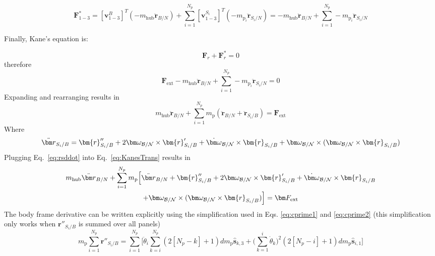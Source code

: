 \begin{equation}
	\bm F^*_{1-3} = [\bm v^{B}_{1-3}]^T (-m_{\text{hub}} \ddot{\bm r}_{B/N}) + \sum\limits_{i=1}^{N_p}[\bm v^{S_i}_{1-3}]^T (-m_{\text{p}_i} \ddot{\bm r}_{S_{i}/N}) = -m_{\text{hub}} \ddot{\bm r}_{B/N} + \sum\limits_{i=1}^{N_p} -m_{\text{p}_i}\ddot{\bm r}_{S_{i}/N}
\end{equation}

Finally, Kane's equation is:

\begin{equation}
	\bm F_r + \bm F^*_r = 0
	\label{eq:KanesEq}
\end{equation}
therefore
\begin{equation}
	\bm F_{\text{ext}} -m_{\text{hub}} \ddot{\bm r}_{B/N} + \sum\limits_{i=1}^{N_p} -m_{\text{p}_i}\ddot{\bm r}_{S_{i}/N} = 0
\end{equation}
Expanding and rearranging results in
\begin{equation}
	m_{\text{hub}} \ddot{\bm r}_{B/N}  + \sum\limits_{i=1}^{N_p} m_{\text{p}} (\ddot{\bm r}_{B/N} + \ddot{\bm r}_{S_{i}/B}) = \bm F_{\text{ext}}
	\label{eq:KanesTrans}
\end{equation}
Where
\begin{equation}
	\ddot{\bm r}_{S_i/B} = \bm{r}''_{S_i/B} + 2 \bm\omega_{\cal B/N} \times \bm{r}'_{S_i/B} +  \dot{\bm\omega}_{\cal B/N} \times \bm{r}_{S_i/B} + \bm\omega_{\cal B/N} \times (\bm\omega_{\cal B/N} \times \bm{r}_{S_i/B})
	\label{eq:rsddot}
\end{equation}
Plugging Eq.~\eqref{eq:rsddot} into Eq.~\eqref{eq:KanesTrans} results in
\begin{multline}
	m_{\text{hub}} \ddot{\bm r}_{B/N} +  \sum\limits_{i=1}^{N_p} m_{\text{p}} \Big[\ddot{\bm r}_{B/N} +  \bm{r}''_{S_i/B}
	+ 2 \bm\omega_{\cal B/N} \times \bm{r}'_{S_i/B} +  \dot{\bm\omega}_{\cal B/N} \times \bm{r}_{S_i/B}
	\\ + \bm\omega_{\cal B/N} \times (\bm\omega_{\cal B/N} \times \bm{r}_{S_i/B})\Big] = \bm F_{\text{ext}}
\end{multline}
The body frame derivative can be written explicitly using the simplification used in Eqs. \ref{eq:cprime1} and \ref{eq:cprime2} (this simplification only works when $\bm{r}''_{S_i/B}$ is summed over all panels)
\begin{equation}
	m_{\text{p}} \sum^{N_p}_{i=1} \bm{r}''_{S_i/B} = \sum^{N_p}_{i=1} \Big[ \ddot{\theta}_i \sum^{N_p}_{k=i} (2[N_p-k]+1) d m_{\text{p}} \bm{\hat{s}}_{k,3} + \Big(\sum^{i}_{k=1}\dot{\theta}_k\Big)^2 (2[N_p-i]+1) d m_{\text{p}} \bm{\hat{s}}_{i,1} \Big]
\end{equation}
